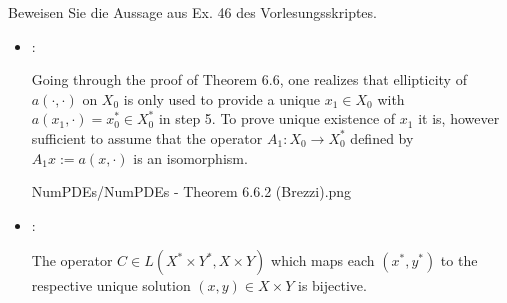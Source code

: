 
\begin{exercise}

Beweisen Sie die Aussage aus Ex. 46 des Vorlesungsskriptes.


\end{exercise}


\begin{solution}

\phantom{}

\begin{itemize}
  
  \item \Quote{$\impliedby$}:
  
  Going through the proof of Theorem 6.6, one realizes that ellipticity of $a(\cdot, \cdot)$ on $X_0$ is only used to provide a unique $x_1 \in X_0$ with $a(x_1, \cdot) = x_0^\ast \in X_0^\ast$ in step 5.
  To prove unique existence of $x_1$ it is, however sufficient to assume that the operator $A_1: X_0 \to X_0^\ast$ defined by $A_1 x := a(x, \cdot)$ is an isomorphism.

  {NumPDEs/NumPDEs - Theorem 6.6.2 (Brezzi).png}

  \begin{comment}

    In the proof of Theorem 6.6 the ellipticity of $a(\cdot, \cdot)$ on $X_0$ is only used to provide a unique $x_1 \in X_0$ with $a(x_1, \cdot) = x^\ast - a(x_2, \cdot) \in X_0^\ast$ in Step 5.
    Replacing the assumption for $a$ in Theorem 6.6 with our assumptions, we first obtain that $A_1: X_0 \to X_0^\ast$ is an isomorphism.
    With that we can conclude again, that there is an unique $x_1 \in X_0$ with $a(x_1, \cdot) = x^\ast - a(x_2, \cdot) \in X_0^\ast$.

  \end{comment}

  \item \Quote{$\implies$}:

  The operator $C \in L(X^\ast \times Y^\ast, X \times Y)$ which maps each $(x^\ast, y^\ast)$ to the respective unique solution $(x, y) \in X \times Y$ is bijective.


\end{itemize}
\end{solution}

